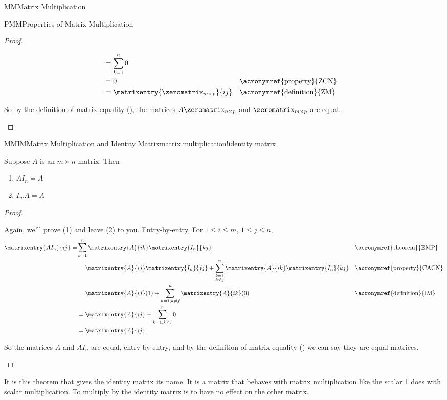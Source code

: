 \begin{subsect}{MM}{Matrix Multiplication}
\begin{subsect}{PMM}{Properties of Matrix Multiplication}
\begin{proof}
\begin{para}
\begin{align*}
%
&=\sum_{k=1}^{n}0\\
%
&=0
&&\text{\acronymref{property}{ZCN}}\\
%
&=\matrixentry{\zeromatrix_{m\times p}}{ij}
&&\text{\acronymref{definition}{ZM}}
\end{align*}
\end{para}
%
\begin{para}So by the definition of matrix equality (), the matrices $A\zeromatrix_{n\times p}$ and $\zeromatrix_{m\times p}$ are equal.\end{para}
%
\end{proof}
%
\begin{theorem}{MMIM}{Matrix Multiplication and Identity Matrix}{matrix multiplication!identity matrix}
\begin{para}Suppose $A$ is an $m\times n$ matrix.  Then
\begin{enumerate}
\item $AI_n=A$
\item $I_mA=A$
\end{enumerate}
\end{para}
\end{theorem}
%
\begin{proof}
\begin{para}Again, we'll prove (1) and leave (2) to you.  Entry-by-entry,    For $1\leq i\leq m$, $1\leq j\leq n$,
%
\begin{align*}
\matrixentry{AI_n}{ij}=&
\sum_{k=1}^{n}\matrixentry{A}{ik}\matrixentry{I_n}{kj}
&&\text{\acronymref{theorem}{EMP}}\\
%
&=\matrixentry{A}{ij}\matrixentry{I_n}{jj}+\sum_{\substack{k=1\\k\neq j}}^{n}\matrixentry{A}{ik}\matrixentry{I_n}{kj}
&&\text{\acronymref{property}{CACN}}\\
%
&=\matrixentry{A}{ij}(1)+\sum_{k=1, k\neq j}^{n}\matrixentry{A}{ik}(0)
&&\text{\acronymref{definition}{IM}}\\
%
&=\matrixentry{A}{ij}+\sum_{k=1, k\neq j}^{n}0\\
&=\matrixentry{A}{ij}
\end{align*}
\end{para}
%
\begin{para}So the matrices $A$ and $AI_n$ are equal, entry-by-entry, and by the definition of matrix equality () we can say they are equal matrices.\end{para}
%
\end{proof}
%
\begin{para}It is this theorem that gives the identity matrix its name.  It is a matrix that behaves with matrix multiplication like the scalar 1 does with scalar multiplication.  To multiply by the identity matrix is to have no effect on the other matrix.\end{para}

\end{subsect}
\end{subsect}
